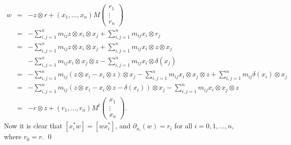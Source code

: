 \documentclass[a4paper]{amsart}
\begin{document}
$$\begin{array}{ccl}
   w&=&-z{\otimes} r+(x_1,\dots,x_n)M\left(
                                                                          \begin{array}{c}
                                                                          r_1\\
                                                                            \vdots \\
                                                                            r_n
                                                                          \end{array}
                                                                        \right)\\
   &=&\displaystyle-\sum_{i,j=1}^nm_{ij}z{\otimes} x_i{\otimes} x_j+\sum_{i,j=1}^nm_{ij}x_i{\otimes} r_j\\
   &=&\displaystyle-\sum_{i,j=1}^nm_{ij}z{\otimes} x_i{\otimes} x_j+\sum_{i,j=1}^nm_{ij}x_i{\otimes} z{\otimes} x_j\\
   &&\displaystyle-\sum_{i,j=1}^nm_{ij}x_i{\otimes} x_j{\otimes} z -\sum_{i,j=1}^nm_{ij}x_i{\otimes} \delta(x_j)\\
   &=&-\displaystyle\sum_{i,j=1}^nm_{ij}(z{\otimes} x_i-x_i{\otimes} z){\otimes} x_j-\sum_{i,j=1}^nm_{ij}x_i{\otimes} x_j{\otimes} z +\sum_{i,j=1}^nm_{ij}\delta(x_i){\otimes} x_j\\
   &=&-\displaystyle\sum_{i,j=1}^nm_{ij}(z{\otimes} x_i-x_i{\otimes} z-\delta(x_i)){\otimes} x_j-\sum_{i,j=1}^nm_{ij}x_i{\otimes} x_j{\otimes} z\\
   &=&-r{\otimes} z+(r_1,\dots,r_n)M^t\left(
                                                                          \begin{array}{c}
                                                                          x_1\\
                                                                            \vdots \\
                                                                            x_n
                                                                          \end{array}
                                                                        \right).
  \end{array}
$$
Now it is clear that $[x_i^*w]=[wx_i^*]$, and $\partial_{x_i}(w)=r_i$ for all $i=0,1,\dots,n$, where $r_0=r$. \qed
\end{document}
